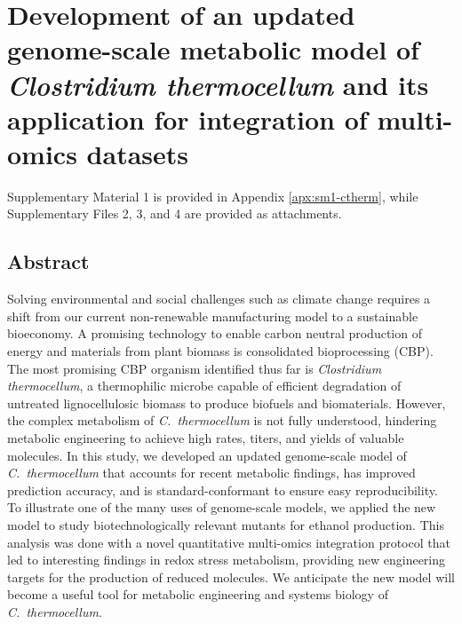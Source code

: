 \chapter{Development of an updated genome-scale metabolic model of \textit{Clostridium thermocellum} and its application for integration of multi-omics datasets} \label{ch:ctherm}

Supplementary Material 1 is provided in Appendix \ref{apx:sm1-ctherm}, while Supplementary Files 2, 3, and 4 are provided as attachments.


\makeatletter
\newcommand\ko[1]{{\@for\tmp:=#1\do{\textit{$\Delta$\tmp}}}}
\makeatother

\newcommand\pFBA{\mathrm{pFBA}}
\newcommand\FVA{\mathrm{FVA}}
\renewcommand\sim{\mathrm{sim}}
\newcommand\meas{\mathrm{meas}}
\newcommand\FC{\mathit{FC}}

\section*{Abstract}
    Solving environmental and social challenges such as climate change requires a shift from our current non-renewable manufacturing model to a sustainable bioeconomy.
    A promising technology to enable carbon neutral production of energy and materials from plant biomass is consolidated bioprocessing (CBP). The most promising CBP organism identified thus far is \textit{Clostridium thermocellum}, a thermophilic microbe capable of efficient degradation of untreated lignocellulosic biomass to produce biofuels and biomaterials.
    However, the complex metabolism of \textit{C.~thermocellum} is not fully understood, hindering metabolic engineering to achieve high rates, titers, and yields of valuable molecules.
    In this study, we developed an updated genome-scale model of \textit{C.~thermocellum} that accounts for recent metabolic findings, has improved prediction accuracy, and is standard-conformant to ensure easy reproducibility.
    To illustrate one of the many uses of genome-scale models,  we applied the new model to study biotechnologically relevant mutants for ethanol production. This analysis was done with a novel quantitative multi-omics integration protocol that led to interesting findings in redox stress metabolism, providing new engineering targets for the production of reduced molecules.
    We anticipate the new model will become a useful tool for metabolic engineering and systems biology of \textit{C.~thermocellum}.


